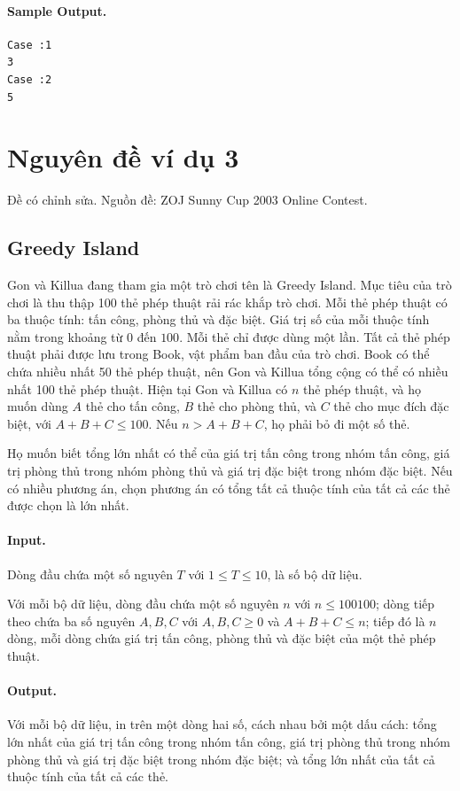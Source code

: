 \documentclass[11pt]{article}
\begin{document}
\paragraph{Sample Output.}
\begin{verbatim}
Case :1
3
Case :2
5
\end{verbatim}

\section{Nguyên đề ví dụ 3}

Đề có chỉnh sửa. Nguồn đề: ZOJ Sunny Cup 2003 Online Contest.

\subsection*{Greedy Island}

Gon và Killua đang tham gia một trò chơi tên là Greedy Island. Mục tiêu của
trò chơi là thu thập 100 thẻ phép thuật rải rác khắp trò chơi. Mỗi thẻ phép
thuật có ba thuộc tính: tấn công, phòng thủ và đặc biệt. Giá trị số của mỗi
thuộc tính nằm trong khoảng từ $0$ đến $100$. Mỗi thẻ chỉ được dùng một lần.
Tất cả thẻ phép thuật phải được lưu trong Book, vật phẩm ban đầu của trò chơi.
Book có thể chứa nhiều nhất 50 thẻ phép thuật, nên Gon và Killua tổng cộng có
thể có nhiều nhất 100 thẻ phép thuật. Hiện tại Gon và Killua có $n$ thẻ phép
thuật, và họ muốn dùng $A$ thẻ cho tấn công, $B$ thẻ cho phòng thủ, và $C$ thẻ
cho mục đích đặc biệt, với $A+B+C\le 100$. Nếu $n>A+B+C$, họ phải bỏ đi một
số thẻ.

Họ muốn biết tổng lớn nhất có thể của giá trị tấn công trong nhóm tấn công,
giá trị phòng thủ trong nhóm phòng thủ và giá trị đặc biệt trong nhóm đặc
biệt. Nếu có nhiều phương án, chọn phương án có tổng tất cả thuộc tính của
tất cả các thẻ được chọn là lớn nhất.

\paragraph{Input.}
Dòng đầu chứa một số nguyên $T$ với $1\le T\le 10$, là số bộ dữ liệu.

Với mỗi bộ dữ liệu, dòng đầu chứa một số nguyên $n$ với $n\le 100100$; dòng
tiếp theo chứa ba số nguyên $A,B,C$ với $A,B,C\ge 0$ và $A+B+C\le n$; tiếp đó
là $n$ dòng, mỗi dòng chứa giá trị tấn công, phòng thủ và đặc biệt của một thẻ
phép thuật.

\paragraph{Output.}
Với mỗi bộ dữ liệu, in trên một dòng hai số, cách nhau bởi một dấu cách: tổng
lớn nhất của giá trị tấn công trong nhóm tấn công, giá trị phòng thủ trong
nhóm phòng thủ và giá trị đặc biệt trong nhóm đặc biệt; và tổng lớn nhất của
tất cả thuộc tính của tất cả các thẻ.
\end{document}
